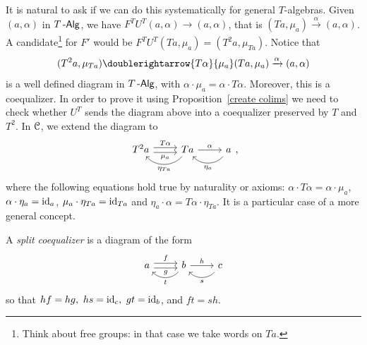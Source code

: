 \documentclass[a4paper,11pt,oneside,openany]{scrbook}
\begin{document}
It is natural to ask if we can do this systematically for general $T$-algebras. Given $(a,\alpha)$ in $T\operatorname{-\mathsf{Alg}}$, we have $F^TU^T(a,\alpha)\to(a,\alpha)$, that is $(Ta,\mu_a)\xrightarrow{\alpha}(a,\alpha)$. A candidate\footnote{Think about free groups: in that case we take words on $Ta$.} for $F'$ would be $F^TU^T(Ta, \mu_a)=(T^2a, \mu_{Ta})$. Notice that
\[
	(T^2a,\mu_{Ta}) \doublerightarrow{T\alpha}{\mu_a}(Ta,\mu_a)\xrightarrow{\alpha}(a,\alpha)
\]
is a well defined diagram in $T\operatorname{-\mathsf{Alg}}$, with $\alpha\cdot\mu_a=\alpha\cdot
	T\alpha$. Moreover, this is a coequalizer. In order to prove it using
Proposition~\ref{create colims} we need to check whether $U^T$
sends the diagram above into a coequalizer preserved by $T$ and $T^2$. In $\operatorname{\mathcal{C}}$,
we extend the diagram to
\[
	\begin{tikzcd}
		T^2a\arrow[r, shift left, "T\alpha"] \arrow[r, shift right, "\mu_a"']
		&Ta  \arrow[r, "\alpha"] \arrow[l, bend left=49, swap, "\eta_{Ta}"'] & a \arrow[l, bend left=49, swap, "\eta_a"']
	\end{tikzcd}
	,\]
where the following equations hold true by naturality or axioms: $\alpha\cdot
	T\alpha=\alpha\cdot\mu_a$, $\alpha\cdot\eta_a=\operatorname{id}_a$,
$\mu_a\cdot\eta_{Ta}=\operatorname{id}_{Ta}$ and
$\eta_a\cdot\alpha=T\alpha\cdot\eta_{Ta}$. It is a particular case of a
more general concept.
\begin{defn}
	A \emph{split coequalizer} is a diagram of the form
	\vspace*{-2.4mm}
	\[
		\begin{tikzcd}[ampersand replacement=\&]
			a\arrow[r, shift left, "f"] \arrow[r, shift right, "g"']
			\& b \arrow[r, "h"] \arrow[l, bend left=49, "t"] \& c \arrow[l, bend left=49, "s"]
		\end{tikzcd}
	\]
	so that $hf=hg,\ hs=\id_c,\ gt=\id_b$, and $ft=sh$.
\end{defn}
\end{document}
